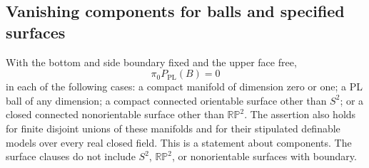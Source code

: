 \subsection{Vanishing components for balls and specified surfaces}

\begin{theorem}\label{thm:low-concordance-components}
With the bottom and side boundary fixed and the upper face free,
\[
                         \pi_0P_{\mathrm{PL}}(B)=0
\]
in each of the following cases: a compact manifold of dimension zero
or one; a PL ball of any dimension; a compact connected orientable surface other
than $S^2$; or a closed connected nonorientable surface other than
$\mathbb{RP}^2$.  The assertion also holds for finite disjoint unions
of these manifolds and for their stipulated definable models over every
real closed field.
This is a statement about components.  The surface clauses do not
include $S^2$, $\mathbb{RP}^2$, or nonorientable surfaces with boundary.
\end{theorem}

